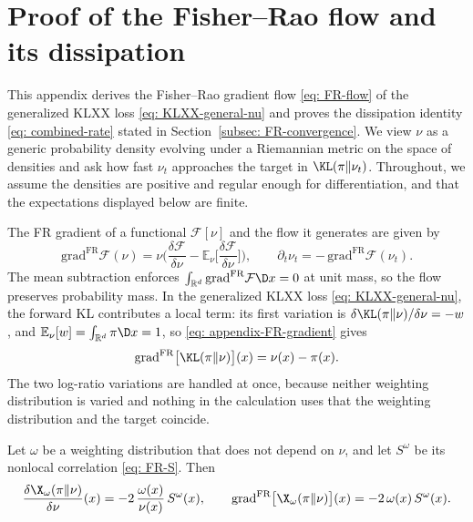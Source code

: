 \documentclass{article}
\begin{document}
\appendix

\section{Proof of the Fisher--Rao flow and its dissipation}
\label{sec: appendix-FR}

This appendix derives the Fisher--Rao gradient flow \eqref{eq: FR-flow} of the generalized KLXX loss \eqref{eq: KLXX-general-nu} and proves the dissipation identity \eqref{eq: combined-rate} stated in Section~\ref{subsec: FR-convergence}. We view $\nu$ as a generic probability density evolving under a Riemannian metric on the space of densities \citep{ambrosio2008gradient,villani2009optimal} and ask how fast $\nu_t$ approaches the target in $\KL(\pi\|\nu_t)$.
Throughout, we assume the densities are positive and regular enough for differentiation, and that the expectations displayed below are finite.

The FR gradient of a functional $\mathcal F[\nu]$ and the flow it generates are given by
\begin{equation}
    \mathrm{grad}^{\mathrm{FR}}\mathcal F(\nu) = \nu\biggl(\frac{\delta\mathcal F}{\delta\nu} - \mathbb E_{\nu}\Big[\frac{\delta\mathcal F}{\delta\nu}\Big]\biggr),
    \qquad
    \partial_t\nu_t = -\,\mathrm{grad}^{\mathrm{FR}}\mathcal F(\nu_t).
    \label{eq: appendix-FR-gradient}
\end{equation}
The mean subtraction enforces $\int_{\mathbb R^d}\mathrm{grad}^{\mathrm{FR}}\mathcal F\D x = 0$ at unit mass, so the flow preserves probability mass.
In the generalized KLXX loss \eqref{eq: KLXX-general-nu},
the forward KL contributes a local term: its first variation is $\delta\KL(\pi\|\nu)/\delta\nu = -w$, and $\mathbb E_\nu[w] = \int_{\mathbb R^d}\pi\D x = 1$, so \eqref{eq: appendix-FR-gradient} gives
\begin{equation}
    \mathrm{grad}^{\mathrm{FR}}\bigl[\KL(\pi\|\nu)\bigr](x) = \nu(x)-\pi(x).
    \label{eq: appendix-FR-grad-KL}
\end{equation}
The two log-ratio variations are handled at once, because neither weighting distribution is varied and nothing in the calculation uses that the weighting distribution and the target coincide.

\begin{lemma}
\label{lem: appendix-variation}
Let $\omega$ be a weighting distribution that does not depend on $\nu$, and let $S^{\omega}$ be its nonlocal correlation \eqref{eq: FR-S}. Then
\begin{equation}
    \frac{\delta \X_\omega(\pi\|\nu)}{\delta\nu}(x) = -2\,\frac{\omega(x)}{\nu(x)}\,S^{\omega}(x),
    \qquad
    \mathrm{grad}^{\mathrm{FR}}\bigl[\X_\omega(\pi\|\nu)\bigr](x) = -2\,\omega(x)\,S^{\omega}(x).
    \label{eq: appendix-FR-grad-X}
\end{equation}
\end{lemma}
\end{document}
